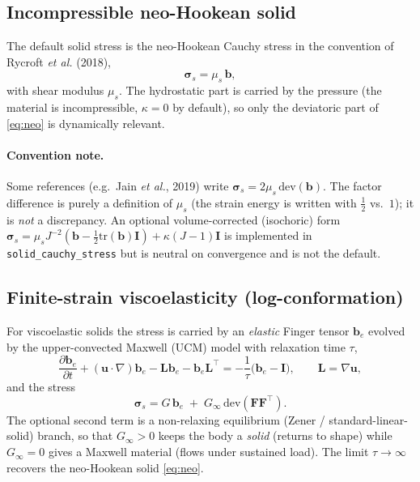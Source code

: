 \documentclass[11pt]{article}
\newcommand{\uv}{\bm{u}}
\newcommand{\Ften}{\bm{F}}
\newcommand{\bten}{\bm{b}}
\newcommand{\grad}{\nabla}
\newcommand{\dd}[2]{\frac{\partial #1}{\partial #2}}
\begin{document}
\subsection{Incompressible neo-Hookean solid}
The default solid stress is the neo-Hookean Cauchy stress in the convention of
Rycroft \emph{et al.} (2018),
\begin{equation}
\bm{\sigma}_{\!s} = \mu_s\,\bten ,
\label{eq:neo}
\end{equation}
with shear modulus $\mu_s$. The hydrostatic part is carried by the pressure (the
material is incompressible, $\kappa=0$ by default), so only the deviatoric part of
\eqref{eq:neo} is dynamically relevant.
\paragraph{Convention note.} Some references (e.g.\ Jain \emph{et al.}, 2019) write
$\bm\sigma_s = 2\mu_s\,\mathrm{dev}(\bten)$. The factor difference is purely a
definition of $\mu_s$ (the strain energy is written with $\tfrac12$ vs.\ $1$); it is
\emph{not} a discrepancy. An optional volume-corrected (isochoric) form
$\bm\sigma_s=\mu_s J^{-2}(\bten-\tfrac12\mathrm{tr}(\bten)\bm I)+\kappa(J-1)\bm I$ is
implemented in \texttt{solid\_cauchy\_stress} but is neutral on convergence and is
not the default.

\subsection{Finite-strain viscoelasticity (log-conformation)}
\label{sec:ve}
For viscoelastic solids the stress is carried by an \emph{elastic} Finger tensor
$\bten_e$ evolved by the upper-convected Maxwell (UCM) model with relaxation time
$\tau$,
\begin{equation}
\dd{\bten_e}{t}+(\uv\!\cdot\!\grad)\bten_e - \bm{L}\bten_e - \bten_e\bm{L}^{\!\top}
= -\frac{1}{\tau}\bigl(\bten_e-\bm I\bigr),
\qquad \bm L=\grad\uv ,
\label{eq:ucm}
\end{equation}
and the stress
\begin{equation}
\bm{\sigma}_{\!s} = G\,\bten_e \;+\; G_\infty\,\mathrm{dev}(\Ften\Ften^{\!\top}).
\label{eq:vestress}
\end{equation}
The optional second term is a non-relaxing equilibrium (Zener / standard-linear-solid)
branch, so that $G_\infty>0$ keeps the body a \emph{solid} (returns to shape) while
$G_\infty=0$ gives a Maxwell material (flows under sustained load). The limit
$\tau\!\to\!\infty$ recovers the neo-Hookean solid \eqref{eq:neo}.
\end{document}
